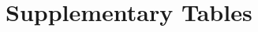 \documentclass[11pt,letterpaper]{article}
\begin{document}
\maketitle



\printbibliography

\appendix
\section{Supplementary Tables}


\end{document}
